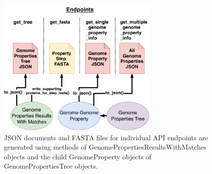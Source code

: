 \begin{figure}[!ht]
  \centering
	\includegraphics[width=0.70\textwidth]{media/Micromeda-Endpoints.pdf}
	 \caption{JSON documents and FASTA files for individual API endpoints are generated using methods of GenomePropertiesResultsWithMatches objects and the child GenomeProperty objects of GenomePropertiesTree objects.}
	 \label{fig:micromeda-endpoints}
\end{figure}

